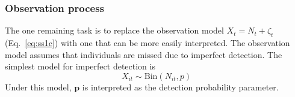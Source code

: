 \documentclass[12pt]{article}
\begin{document}

\subsubsection{Observation process}

The one
remaining task is to replace the observation model
$X_t = N_t + \zeta_t$ (Eq.~\ref{eq:ss1c}) with one that can be
more easily interpreted. The observation
model assumes that individuals are missed due to imperfect
detection. The simplest model for imperfect detection is
\begin{equation}
  X_{it} \sim \mathrm{Bin}(N_{it}, p)
  \label{eq:p1}
\end{equation}
Under this model, $\bm{p}$ is interpreted as the detection
probability parameter.


\end{document}
